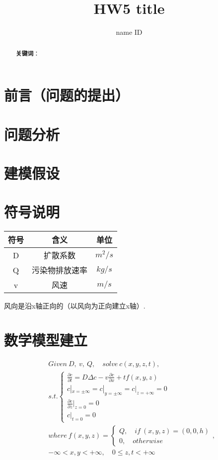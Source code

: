 \documentclass{article}
\title{\bfseries HW5 title}
\author{name \quad ID}
\begin{document}
	\maketitle
	\begin{abstract}
		
		\par \textbf{关键词}：
	\end{abstract}
	\setcounter{section}{0}
	
	\tableofcontents
	
	\section{前言（问题的提出）}
	
	\section{问题分析}
	
	\section{建模假设}
	
	\section{符号说明}
	\begin{table}[htbp]
		\centering
		\begin{tabular}{ccc}
			\hline
			符号 & 含义 & 单位 \\
			\hline
			D & 扩散系数 & $m^2/s$ \\
			Q & 污染物排放速率 & $kg/s$ \\
			v & 风速 & $m/s$ \\
			\hline
		\end{tabular}
	\end{table}
	风向是沿x轴正向的（以风向为正向建立x轴）.
	
	\section{数学模型建立}
	\begin{align*}
		&Given ~ D, ~ v, ~ Q, \quad solve ~ c(x,y,z,t),\\
		&s.t.
		\begin{cases}
			\frac{\partial c}{\partial t} = D\Delta c - v\frac{\partial c}{\partial x} + tf(x,y,z)	\\
			c|_{x=\pm\infty}=c|_{y=\pm\infty}=c|_{z=+\infty}=0	\\
			\frac{\partial c}{\partial z}|_{z=0} = 0	\\
			c|_{t=0}=0
		\end{cases}\\
		&where  ~
		f(x,y,z) = 
		\begin{cases}
			Q, \quad if~(x, y, z)=(0, 0, h)\\
			0, \quad otherwise
		\end{cases},\\
		&-\infty<x, y<+\infty, \quad 0\leq z, t<+\infty
	\end{align*}
	
\end{document}

